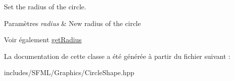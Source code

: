 Set the radius of the circle. 


\begin{DoxyParams}{Paramètres}
{\em radius} & New radius of the circle\\
\hline
\end{DoxyParams}
\begin{DoxySeeAlso}{Voir également}
\hyperlink{classsf_1_1CircleShape_aa3dd5a1b5031486ce5b6f09d43674aa3}{get\+Radius} 
\end{DoxySeeAlso}


La documentation de cette classe a été générée à partir du fichier suivant \+:\begin{DoxyCompactItemize}
\item 
includes/\+S\+F\+M\+L/\+Graphics/Circle\+Shape.\+hpp\end{DoxyCompactItemize}
